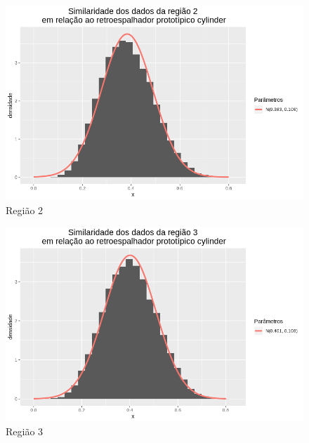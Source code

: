 \documentclass[12pt]{article}
\begin{document}
\begin{figure}[!h]
    \centering
    \vspace{0.08\linewidth}
    \includegraphics[width = \linewidth]{../../Images/Report_18_12_20/cy_region2.png}
    \caption{Região 2}
    \label{fig:cy_r2}
\end{figure}

\begin{figure}[!h]
    \centering
    \vspace{0.1\linewidth}
    \includegraphics[width = \linewidth]{../../Images/Report_18_12_20/cy_region3.png}
    \caption{Região 3}
    \label{fig:cy_r3}
\end{figure}
\end{document}
